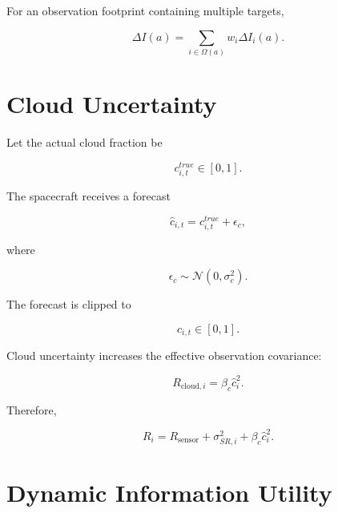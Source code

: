 \documentclass[11pt,a4paper]{article}
\begin{document}
For an observation footprint containing multiple targets,

\begin{equation}
\Delta I(a)
=
\sum_{i\in\Omega(a)}
w_i
\Delta I_i(a).
\end{equation}


\section{Cloud Uncertainty}

Let the actual cloud fraction be

\begin{equation}
c_{i,t}^{true}
\in[0,1].
\end{equation}

The spacecraft receives a forecast

\begin{equation}
\hat c_{i,t}
=
c_{i,t}^{true}
+
\epsilon_c,
\end{equation}

where

\begin{equation}
\epsilon_c
\sim
\mathcal N(0,\sigma_c^2).
\end{equation}

The forecast is clipped to

\begin{equation}
\hat c_{i,t}
\in[0,1].
\end{equation}

Cloud uncertainty increases the effective observation covariance:

\begin{equation}
R_{\mathrm{cloud},i}
=
\beta_c
\hat c_i^2.
\end{equation}

Therefore,

\begin{equation}
R_i
=
R_{\mathrm{sensor}}
+
\sigma_{SR,i}^2
+
\beta_c\hat c_i^2.
\end{equation}


\section{Dynamic Information Utility}
\end{document}
